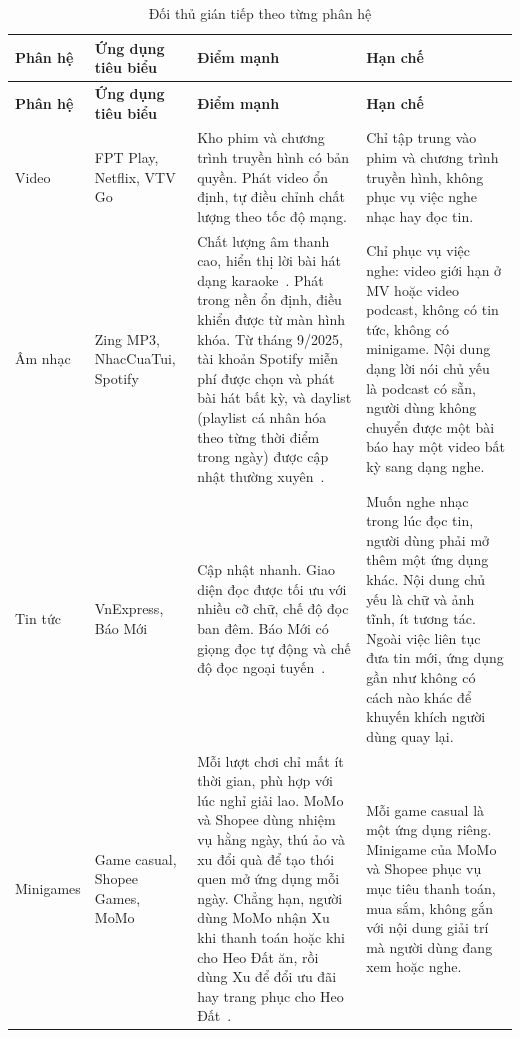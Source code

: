\begingroup
\small
\begin{longtable}{@{}>{\raggedright\arraybackslash}p{1.9cm}>{\raggedright\arraybackslash}p{2.3cm}>{\raggedright\arraybackslash}p{5.6cm}>{\raggedright\arraybackslash}p{5.6cm}@{}}
\caption{Đối thủ gián tiếp theo từng phân hệ}
\label{tab:indirect-competitors} \\
\toprule
\textbf{Phân hệ} & \textbf{Ứng dụng tiêu biểu} & \textbf{Điểm mạnh} & \textbf{Hạn chế} \\
\midrule
\endfirsthead
\toprule
\textbf{Phân hệ} & \textbf{Ứng dụng tiêu biểu} & \textbf{Điểm mạnh} & \textbf{Hạn chế} \\
\midrule
\endhead
\bottomrule
\endfoot
Video & FPT Play, Netflix, VTV Go &
Kho phim và chương trình truyền hình có bản quyền. Phát video ổn định, tự điều chỉnh chất lượng theo tốc độ mạng. &
Chỉ tập trung vào phim và chương trình truyền hình, không phục vụ việc nghe nhạc hay đọc tin. \\
\midrule
Âm nhạc & Zing MP3, NhacCuaTui, Spotify &
Chất lượng âm thanh cao, hiển thị lời bài hát dạng karaoke~\cite{zingmp3-appstore}. Phát trong nền ổn định, điều khiển được từ màn hình khóa. Từ tháng 9/2025, tài khoản Spotify miễn phí được chọn và phát bài hát bất kỳ, và daylist (playlist cá nhân hóa theo từng thời điểm trong ngày) được cập nhật thường xuyên~\cite{spotify-free2025}. &
Chỉ phục vụ việc nghe: video giới hạn ở MV hoặc video podcast, không có tin tức, không có minigame. Nội dung dạng lời nói chủ yếu là podcast có sẵn, người dùng không chuyển được một bài báo hay một video bất kỳ sang dạng nghe. \\
\midrule
Tin tức & VnExpress, Báo Mới &
Cập nhật nhanh. Giao diện đọc được tối ưu với nhiều cỡ chữ, chế độ đọc ban đêm. Báo Mới có giọng đọc tự động và chế độ đọc ngoại tuyến~\cite{baomoi-appstore}. &
Muốn nghe nhạc trong lúc đọc tin, người dùng phải mở thêm một ứng dụng khác. Nội dung chủ yếu là chữ và ảnh tĩnh, ít tương tác. Ngoài việc liên tục đưa tin mới, ứng dụng gần như không có cách nào khác để khuyến khích người dùng quay lại. \\
\midrule
Minigames & Game casual, Shopee Games, MoMo &
Mỗi lượt chơi chỉ mất ít thời gian, phù hợp với lúc nghỉ giải lao. MoMo và Shopee dùng nhiệm vụ hằng ngày, thú ảo và xu đổi quà để tạo thói quen mở ứng dụng mỗi ngày. Chẳng hạn, người dùng MoMo nhận Xu khi thanh toán hoặc khi cho Heo Đất ăn, rồi dùng Xu để đổi ưu đãi hay trang phục cho Heo Đất~\cite{momo-shopxu}. &
Mỗi game casual là một ứng dụng riêng. Minigame của MoMo và Shopee phục vụ mục tiêu thanh toán, mua sắm, không gắn với nội dung giải trí mà người dùng đang xem hoặc nghe. \\
\end{longtable}
\endgroup

